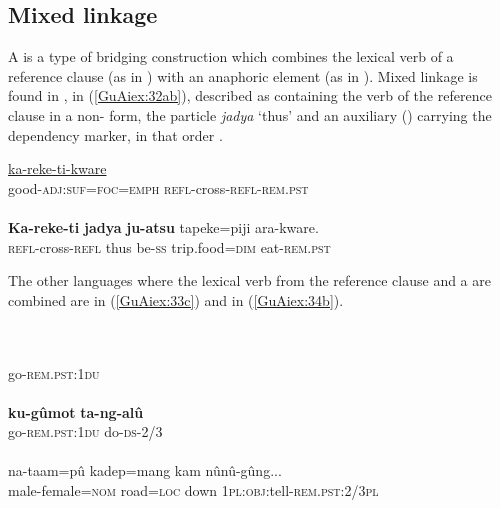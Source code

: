 \documentclass[output=paper]{LSP/langsci}
\begin{document}
\subsection{Mixed linkage}
\label{GuAi33mixedlink}
A  is a type of bridging construction which combines the lexical verb of a reference clause (as in ) with an anaphoric element (as in ). Mixed linkage is found in , in (\ref{GuAiex:32ab}), described as containing the verb of the reference clause in a non- form, the particle \textit{jadya} `thus' and an auxiliary () carrying the dependency marker, in that order \citep[][129]{Guillaume2011}.

\begin{exe}
\ex \label{GuAiex:32ab}
\begin{xlist}
\ex \label{GuAiex:32a}
\gll \underline{}       \underline{ka-reke-ti-kware}\\
 good-\textsc{adj:suf}=\textsc{foc}=\textsc{emph}   \textsc{refl}-cross-\textsc{refl}-\textsc{rem.pst}\\
\glt {} \\
\ex \label{GuAiex:32b}
\gll  \textbf{Ka-reke-ti}    \textbf{jadya}  \textbf{ju-atsu} tapeke=piji   ara-kware.\\
\textsc{refl}-cross-\textsc{refl}   thus   be-\textsc{ss}     trip.food=\textsc{dim}   eat-\textsc{rem.pst}\\
\glt {}
\end{xlist}
\end{exe}


The other languages where the lexical verb from the reference clause and a  are combined are  in (\ref{GuAiex:33c}) and  in (\ref{GuAiex:34b}).  

\begin{exe}
\ex \label{GuAiex:33ad}
\begin{xlist}
\ex \label{GuAiex:33a}
\glt {}\\ \vspace{-0.2in}
\ex \label{GuAiex:33b}
\gll \underline{}\\
go-\textsc{rem}.\textsc{pst:1du}\\
\glt {}\\
\ex \label{GuAiex:33c}
\gll  \textbf{ku-gûmot} \textbf{ta-ng-alû}\\
go-\textsc{rem.pst:1du}   do-\textsc{ds-2/3}\\
\glt {}\\
\ex \label{GuAiex:33d}
\gll  na-taam=pû     kadep=mang   kam   nûnû-gûng...\\
male-female=\textsc{nom}   road=\textsc{loc}   down   \textsc{1pl:obj}:tell-\textsc{rem.pst:2/3pl}\\
\glt {}
\end{xlist}
\end{exe}
\end{document}
